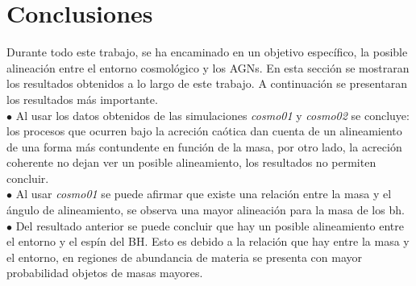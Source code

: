 \section{Conclusiones}
\label{sec: conclusiones}
Durante todo este trabajo, se ha encaminado en un objetivo específico, la posible alineación entre el entorno cosmológico y los AGNs. En esta sección se mostraran los resultados obtenidos a lo largo de este trabajo. A continuación se presentaran los resultados más importante.~\\


$\bullet$ Al usar los datos obtenidos de las simulaciones {\it{cosmo01}} y {\it{cosmo02}} se concluye: los procesos que ocurren bajo la acreción caótica dan cuenta de un alineamiento de una forma más contundente en función de la masa, por otro lado, la acreción coherente no dejan ver un posible alineamiento, los resultados no permiten concluir. ~\\


$\bullet$ Al usar {\it{cosmo01}} se puede afirmar que existe una relación entre la masa y el ángulo de alineamiento, se observa una mayor alineación para la masa de los bh.~\\

$\bullet$ Del resultado anterior se puede concluir que hay un posible alineamiento entre el entorno y el espín del BH. Esto es debido a la relación que hay entre la masa y el entorno, en regiones de abundancia de materia se presenta con mayor probabilidad objetos de masas mayores.






